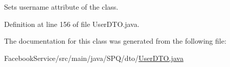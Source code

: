 Sets username attribute of the class. 

Definition at line 156 of file User\+D\+T\+O.\+java.



The documentation for this class was generated from the following file\+:\begin{DoxyCompactItemize}
\item 
Facebook\+Service/src/main/java/\+S\+P\+Q/dto/\mbox{\hyperlink{_facebook_service_2src_2main_2java_2_s_p_q_2dto_2_user_d_t_o_8java}{User\+D\+T\+O.\+java}}\end{DoxyCompactItemize}
